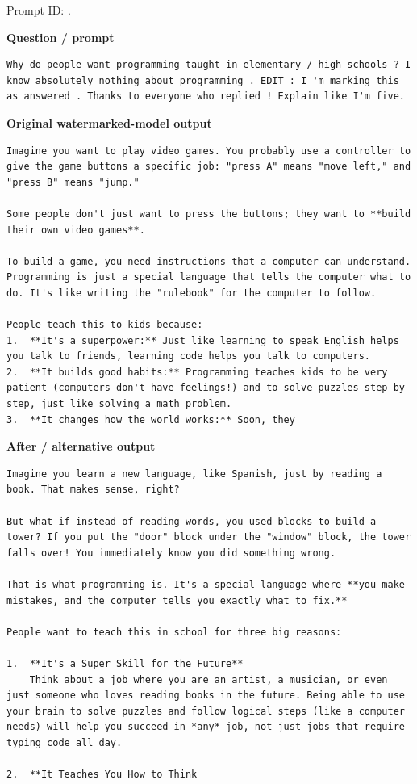 Prompt ID:
\texttt{}.

\textbf{Question / prompt}

\begin{Verbatim}
Why do people want programming taught in elementary / high schools ? I know absolutely nothing about programming . EDIT : I 'm marking this as answered . Thanks to everyone who replied ! Explain like I'm five.
\end{Verbatim}

\textbf{Original watermarked-model output}

\begin{Verbatim}
Imagine you want to play video games. You probably use a controller to give the game buttons a specific job: "press A" means "move left," and "press B" means "jump."

Some people don't just want to press the buttons; they want to **build their own video games**.

To build a game, you need instructions that a computer can understand. Programming is just a special language that tells the computer what to do. It's like writing the "rulebook" for the computer to follow.

People teach this to kids because:
1.  **It's a superpower:** Just like learning to speak English helps you talk to friends, learning code helps you talk to computers.
2.  **It builds good habits:** Programming teaches kids to be very patient (computers don't have feelings!) and to solve puzzles step-by-step, just like solving a math problem.
3.  **It changes how the world works:** Soon, they
\end{Verbatim}

\textbf{After / alternative output}

\begin{Verbatim}
Imagine you learn a new language, like Spanish, just by reading a book. That makes sense, right?

But what if instead of reading words, you used blocks to build a tower? If you put the "door" block under the "window" block, the tower falls over! You immediately know you did something wrong.

That is what programming is. It's a special language where **you make mistakes, and the computer tells you exactly what to fix.**

People want to teach this in school for three big reasons:

1.  **It's a Super Skill for the Future**
    Think about a job where you are an artist, a musician, or even just someone who loves reading books in the future. Being able to use your brain to solve puzzles and follow logical steps (like a computer needs) will help you succeed in *any* job, not just jobs that require typing code all day.

2.  **It Teaches You How to Think
\end{Verbatim}

